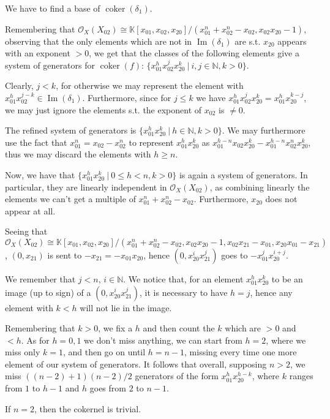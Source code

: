 \documentclass{article}
\newcommand{\numberset}{\mathbb}
\newcommand{\N}{\numberset{N}}
\newcommand{\K}{\numberset{K}}
\DeclareMathOperator{\Ima}{Im}
\DeclareMathOperator{\coker}{coker}
\begin{document}
We have to find a base of $\coker(\delta_1)$.

Remembering that $\mathcal{O}_X(X_{02})\cong\K[x_{01},x_{02},x_{20}]/(x_{01}^n+x_{02}^n-x_{02},x_{02}x_{20}-1)$, observing that the only elements which are not in $\Ima(\delta_1)$ are s.t. $x_{20}$ appears with an exponent $>0$, we get that the classes of the following elements give a system of generators for $\coker(f)$: $\{x_{01}^hx_{02}^jx_{20}^k\ |\ i,j\in\N, k>0\}$.

Clearly, $j<k$, for otherwise we may represent the element with $x_{01}^hx_{02}^{j-k}\in\Ima(\delta_1)$. Furthermore, since for $j\leq k$ we have $x_{01}^hx_{02}^jx_{20}^k=x_{01}^hx_{20}^{k-j}$, we may just ignore the elements s.t. the exponent of $x_{02}$ is $\neq 0$.

The refined system of generators is $\{x_{01}^hx_{20}^k\ |\ h\in\N,k>0\}$. We may furthermore use the fact that $x_{01}^n=x_{02}-x_{02}^n$ to represent $x_{01}^hx_{20}^k$ as $x_{01}^{h-n}x_{02}x_{20}^k-x_{01}^{h-n}x_{02}^nx_{20}^k$, thus we may discard the elements with $h\geq n$.

Now, we have that $\{x_{01}^hx_{20}^k\ |\ 0\leq h<n,k>0\}$ is again a system of generators. In particular, they are linearly independent in $\mathcal{O}_X(X_{02})$, as combining linearly the elements we can't get a multiple of $x_{01}^n+x_{02}^n-x_{02}$. Furthermore, $x_{20}$ does not appear at all.

Seeing that $\mathcal{O}_X(X_{02})\cong\K[x_{01},x_{02},x_{20}]/(x_{01}^n+x_{02}^n-x_{02},x_{02}x_{20}-1,x_{02}x_{21}-x_{01},x_{20}x_{01}-x_{21})$, $(0,x_{21})$ is sent to $-x_{21}=-x_{01}x_{20}$, hence $(0,x_{20}^ix_{21}^j)$ goes to $-x_{01}^jx_{20}^{i+j}$.

We remember that $j<n$, $i\in\N$. We notice that, for an element $x_{01}^hx_{20}^k$ to be an image (up to sign) of a $(0,x_{20}^ix_{21}^j)$, it is necessary to have $h=j$, hence any element with $k<h$ will not lie in the image.

Remembering that $k>0$, we fix a $h$ and then count the $k$ which are $>0$ and $<h$. As for $h=0,1$ we don't miss anything, we can start from $h=2$, where we miss only $k=1$, and then go on until $h=n-1$, missing every time one more element of our system of generators. It follows that overall, supposing $n>2$, we miss $((n-2)+1)(n-2)/2$ generators of the form $x_{01}^hx_{20}^{h-k}$, where $k$ ranges from $1$ to $h-1$ and $h$ goes from $2$ to $n-1$.

If $n=2$, then the cokernel is trivial.
\end{document}
